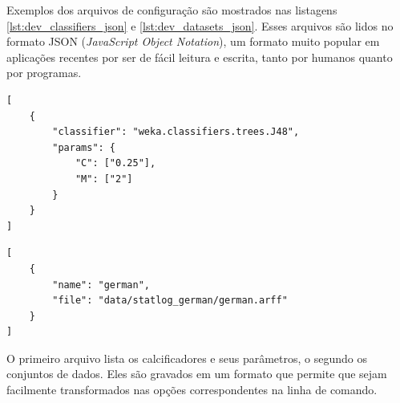 Exemplos dos arquivos de configuração são mostrados nas listagens \ref{lst:dev_classifiers_json} e \ref{lst:dev_datasets_json}. Esses arquivos são lidos no formato JSON (\emph{JavaScript Object Notation}), um formato muito popular em aplicações recentes por ser de fácil leitura e escrita, tanto por humanos quanto por programas.

\vspace{0.5cm}
\begin{lstlisting}[caption=Exemplo de arquivos de configuração de classificadores, label=lst:dev_classifiers_json]
[
    {
        "classifier": "weka.classifiers.trees.J48",
        "params": {
            "C": ["0.25"],
            "M": ["2"]
        }
    }
]
\end{lstlisting}

\begin{lstlisting}[caption=Exemplo de arquivos de configuração de conjuntos de dados, label=lst:dev_datasets_json]
[
    {
        "name": "german",
        "file": "data/statlog_german/german.arff"
    }
]
\end{lstlisting}
\vspace{0.5cm}

O primeiro arquivo lista os calcificadores e seus parâmetros, o segundo os conjuntos de dados. Eles são gravados em um formato que permite que sejam facilmente transformados nas opções correspondentes na linha de comando.
